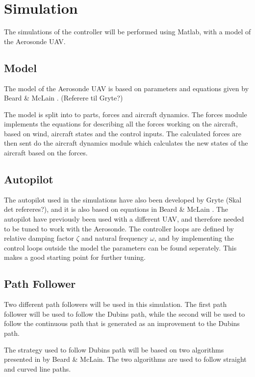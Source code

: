 \section{Simulation}
\label{ch:simulation}

The simulations of the controller will be performed using Matlab, with a model of the Aerosonde UAV. 

\subsection{Model}

The model of the Aerosonde UAV is based on parameters and equations given by Beard \& McLain \cite{suaBEARD}. (Referere til Gryte?)

The model is split into to parts, forces and aircraft dynamics. The forces module implements the equations for describing all the forces working on the aircraft, based on wind, aircraft states and the control inputs. The calculated forces are then sent do the aircraft dynamics module which calculates the new states of the aircraft based on the forces.


\subsection{Autopilot}

The autopilot used in the simulations have also been developed by Gryte (Skal det refereres?), and it is also based on equations in Beard \& McLain \cite{suaBEARD}. The autopilot have previously been used with a different UAV, and therefore needed to be tuned to work with the Aerosonde. The controller loops are defined by relative damping factor $\zeta$ and natural frequency $\omega$, and by implementing the control loops outside the model the parameters can be found seperately. This makes a good starting point for further tuning.

\subsection{Path Follower}
\label{ch:path_follower}

Two different path followers will be used in this simulation. The first path follower will be used to follow the Dubins path, while the second will be used to follow the continuous path that is generated as an improvement to the Dubins path.

The strategy used to follow Dubins path will be based on two algorithms presented in \cite{suaBEARD} by Beard \& McLain. The two algorithms are used to follow straight and curved line paths.

